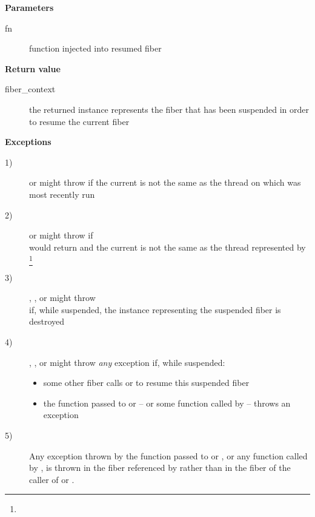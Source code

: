 {\bfseries Parameters}
\begin{description}
    \item[fn] function injected into resumed fiber\\
\end{description}

{\bfseries Return value}
\begin{description}
    \item[fiber\_context] the returned instance represents the fiber that has been
                 suspended in order to resume the current fiber
\end{description}

{\bfseries Exceptions}
\begin{description}
    \item[1)] \resume or \resumewith might throw  if
              the current \thread is not the same as the thread on
              which  was most recently run
    \item[2)] \xtresume or \xtresumewith might throw  if\\
              \usessysstack would return  and the current \thread
              is not the same as the thread represented
              by \footnote{}
    \item[3)] \resume, \resumewith, \xtresume or \xtresumewith might throw\\
              \unwindex if, while suspended, the \fiber instance representing
              the suspended fiber is destroyed
    \item[4)] \resume, \resumewith, \xtresume or \xtresumewith might
              throw \emph{any} exception if, while suspended:
              \begin{itemize}
                  \item some other fiber calls \resumewith or \xtresumewith to
                        resume this suspended fiber
                  \item the function  passed to \resumewith
                        or \xtresumewith -- or some function called
                        by  -- throws an exception
              \end{itemize}
    \item[5)] Any exception thrown by the function  passed
              to \resumewith or \xtresumewith, or any function called
              by , is thrown in the fiber referenced by 
              rather than in the fiber of the caller of \resumewith
              or \xtresumewith.
\end{description}

